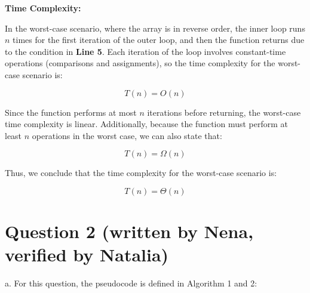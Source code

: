\documentclass[11pt, a4paper]{article}
\begin{document}
\textbf{Time Complexity:}

In the worst-case scenario, where the array is in reverse order, the inner loop runs \( n \) times for the first iteration of the outer loop, and then the function returns due to the condition in \textbf{Line 5}. Each iteration of the loop involves constant-time operations (comparisons and assignments), so the time complexity for the worst-case scenario is:

\[
T(n) = O(n)
\]

Since the function performs at most \( n \) iterations before returning, the worst-case time complexity is linear. Additionally, because the function must perform at least \( n \) operations in the worst case, we can also state that:

\[
T(n) = \Omega(n)
\]

Thus, we conclude that the time complexity for the worst-case scenario is:

\[
T(n) = \Theta(n)
\]

\section*{Question 2 (written by Nena, verified by Natalia)}

a. For this question, the pseudocode is defined in Algorithm 1 and 2: \\
\end{document}
